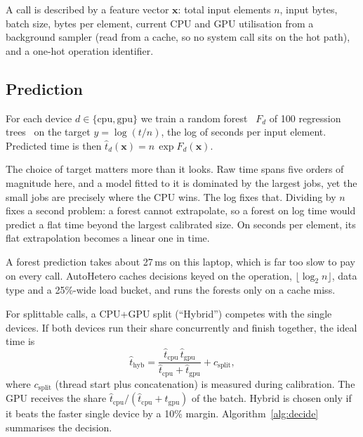 \documentclass[conference]{IEEEtran}
\begin{document}
A call is described by a feature vector $\mathbf{x}$: total input elements $n$, input bytes, batch size, bytes per element, current CPU and GPU utilisation from a background sampler (read from a cache, so no system call sits on the hot path), and a one-hot operation identifier.

\subsection{Prediction}

For each device $d \in \{\mathrm{cpu}, \mathrm{gpu}\}$ we train a random forest~\cite{breiman} $F_d$ of 100 regression trees~\cite{sklearn} on the target $y = \log(t/n)$, the log of seconds per input element. Predicted time is then $\hat t_d(\mathbf{x}) = n\,\exp F_d(\mathbf{x})$.

The choice of target matters more than it looks. Raw time spans five orders of magnitude here, and a model fitted to it is dominated by the largest jobs, yet the small jobs are precisely where the CPU wins. The log fixes that. Dividing by $n$ fixes a second problem: a forest cannot extrapolate, so a forest on log time would predict a flat time beyond the largest calibrated size. On seconds per element, its flat extrapolation becomes a linear one in time.

A forest prediction takes about 27\,ms on this laptop, which is far too slow to pay on every call. AutoHetero caches decisions keyed on the operation, $\lfloor \log_2 n \rfloor$, data type and a 25\%-wide load bucket, and runs the forests only on a cache miss.

For splittable calls, a CPU+GPU split (``Hybrid'') competes with the single devices. If both devices run their share concurrently and finish together, the ideal time is
\begin{equation}
\hat t_{\mathrm{hyb}} = \frac{\hat t_{\mathrm{cpu}}\,\hat t_{\mathrm{gpu}}}{\hat t_{\mathrm{cpu}} + \hat t_{\mathrm{gpu}}} + c_{\mathrm{split}},
\label{eq:hybrid}
\end{equation}
where $c_{\mathrm{split}}$ (thread start plus concatenation) is measured during calibration. The GPU receives the share $\hat t_{\mathrm{cpu}}/(\hat t_{\mathrm{cpu}}+\hat t_{\mathrm{gpu}})$ of the batch. Hybrid is chosen only if it beats the faster single device by a 10\% margin. Algorithm~\ref{alg:decide} summarises the decision.
\end{document}
